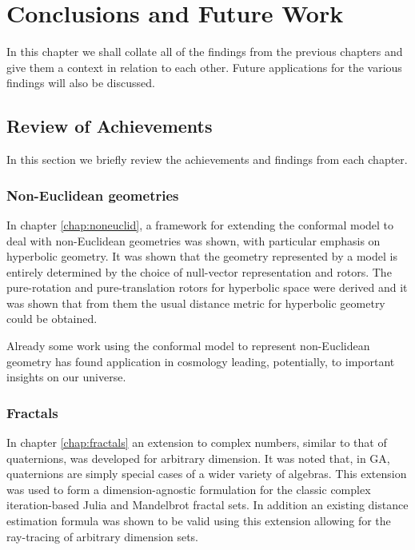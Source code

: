 \chapter{Conclusions and Future Work}

In this chapter we shall collate all of the findings from the previous chapters
and give them a context in relation to each other. Future applications for
the various findings will also be discussed.

\section{Review of Achievements}

In this section we briefly review the achievements and findings from each
chapter.

\subsection{Non-Euclidean geometries}

In chapter \ref{chap:noneuclid}, a framework for extending the conformal
model to deal with non-Euclidean geometries was shown, with particular
emphasis on hyperbolic geometry. It was shown that the geometry
represented by a model is entirely determined by the choice of null-vector
representation and rotors. The pure-rotation and pure-translation 
rotors for hyperbolic space were derived and it was shown that from them the usual
distance metric for hyperbolic geometry could be obtained.

Already some work using the conformal model to represent non-Euclidean geometry
has found application in cosmology\cite{GA:SIGKEY} leading, potentially, to important insights on
our universe.

\subsection{Fractals}

In chapter \ref{chap:fractals} an extension to complex numbers, similar to that
of quaternions, was developed for arbitrary dimension. It was noted that, in
GA, quaternions are simply special cases of a wider variety of algebras. This
extension was used to form a dimension-agnostic formulation for the classic
complex iteration-based Julia and Mandelbrot fractal sets. In addition an
existing distance estimation formula was shown to be valid using this extension
allowing for the ray-tracing of arbitrary dimension sets.

